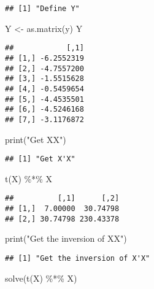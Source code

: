 \documentclass[
]{article}
\newenvironment{Shaded}{\begin{snugshade}}{\end{snugshade}}
\newcommand{\FunctionTok}[1]{\textcolor[rgb]{0.00,0.00,0.00}{#1}}
\newcommand{\NormalTok}[1]{#1}
\newcommand{\OtherTok}[1]{\textcolor[rgb]{0.56,0.35,0.01}{#1}}
\newcommand{\SpecialCharTok}[1]{\textcolor[rgb]{0.00,0.00,0.00}{#1}}
\newcommand{\StringTok}[1]{\textcolor[rgb]{0.31,0.60,0.02}{#1}}
\begin{document}
\begin{verbatim}
## [1] "Define Y"
\end{verbatim}

\begin{Shaded}
\begin{Highlighting}[]
\NormalTok{Y }\OtherTok{\textless{}{-}} \FunctionTok{as.matrix}\NormalTok{(y)}
\NormalTok{Y}
\end{Highlighting}
\end{Shaded}

\begin{verbatim}
##            [,1]
## [1,] -6.2552319
## [2,] -4.7557200
## [3,] -1.5515628
## [4,] -0.5459654
## [5,] -4.4535501
## [6,] -4.5246168
## [7,] -3.1176872
\end{verbatim}

\begin{Shaded}
\begin{Highlighting}[]
\FunctionTok{print}\NormalTok{(}\StringTok{"Get X\textquotesingle{}X"}\NormalTok{)}
\end{Highlighting}
\end{Shaded}

\begin{verbatim}
## [1] "Get X'X"
\end{verbatim}

\begin{Shaded}
\begin{Highlighting}[]
\FunctionTok{t}\NormalTok{(X) }\SpecialCharTok{\%*\%}\NormalTok{ X}
\end{Highlighting}
\end{Shaded}

\begin{verbatim}
##          [,1]      [,2]
## [1,]  7.00000  30.74798
## [2,] 30.74798 230.43378
\end{verbatim}

\begin{Shaded}
\begin{Highlighting}[]
\FunctionTok{print}\NormalTok{(}\StringTok{"Get the inversion of X\textquotesingle{}X"}\NormalTok{)}
\end{Highlighting}
\end{Shaded}

\begin{verbatim}
## [1] "Get the inversion of X'X"
\end{verbatim}

\begin{Shaded}
\begin{Highlighting}[]
\FunctionTok{solve}\NormalTok{(}\FunctionTok{t}\NormalTok{(X) }\SpecialCharTok{\%*\%}\NormalTok{ X)}
\end{Highlighting}
\end{Shaded}
\end{document}
